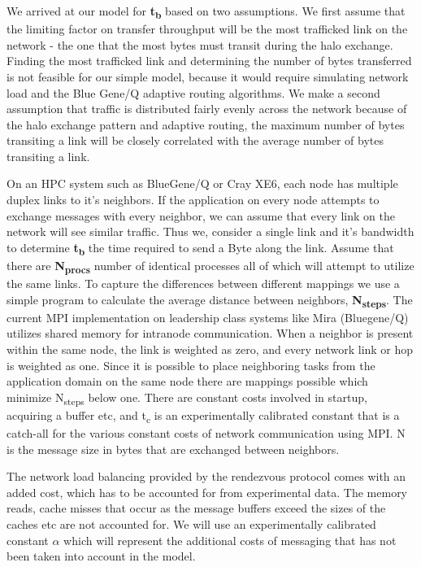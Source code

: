 \documentclass{acm_proc_article-sp}
\begin{document}
We arrived at our model for \textbf{t\textsubscript{b}} based on two assumptions.
We first assume that the limiting factor on transfer throughput will be
the most trafficked link on the network - the one that the most bytes
must transit during the halo exchange.  Finding the most trafficked
link and determining the number of bytes transferred is not feasible for our
simple model, because it would require simulating network load and
the Blue Gene/Q adaptive routing algorithms. We make a second assumption
that traffic is distributed fairly evenly across the network because of
the halo exchange pattern and adaptive routing, the maximum number of bytes
transiting a link will be closely correlated with the average number of bytes transiting a link.

On an HPC system such as BlueGene/Q or Cray XE6, each node has multiple duplex links to it's neighbors.
If the application on every node attempts to exchange messages with every neighbor, we can assume that
every link on the network will see similar traffic. Thus we, consider a single link and it's bandwidth
to determine \textbf{t\textsubscript{b}} the time required to send a Byte along the link.
Assume that there are \textbf{N\textsubscript{procs}} number of identical processes all of which will attempt to utilize the same links.
To capture the differences between different mappings we use a simple program to calculate the average distance between neighbors,
\textbf{N\textsubscript{steps}}. The current MPI implementation on leadership class systems like Mira (Bluegene/Q) utilizes
shared memory for intranode communication. When a neighbor is present within the same node, the link
is weighted as zero, and every network link or hop is weighted as one. Since it is possible to place
neighboring tasks from the application domain on the same node there are mappings possible which
minimize N\textsubscript{steps} below one. There are constant costs involved in startup, acquiring a buffer etc,
and t\textsubscript{c} is an experimentally calibrated constant that is a catch-all for the various constant costs
of network communication using MPI. N is the message size in bytes that are exchanged between neighbors.

The network load balancing provided by the rendezvous protocol comes with an added cost, which has to be
accounted for from experimental data. The memory reads, cache misses that occur as the message buffers exceed
the sizes of the caches etc are not accounted for. We will use an experimentally calibrated constant \textbf{$\alpha$}
which will represent the additional costs of messaging that has not been taken into account in the model.
\end{document}
